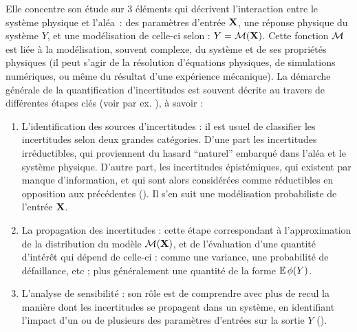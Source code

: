Elle concentre son étude sur 3 éléments qui décrivent l'interaction entre le système physique et l'aléa~: des paramètres d'entrée $\mathbf{X}$, une réponse physique du système $ Y$, et une modélisation de celle-ci selon : $ Y=\mathcal{M}(\mathbf{X})$. %
Cette fonction $\mathcal{M}$ est liée à la modélisation, souvent complexe, du système et de ses propriétés physiques (il peut s'agir de la résolution d'équations physiques, de simulations numériques, ou même du résultat d'une expérience mécanique).
%
La démarche générale de la quantification d'incertitudes est souvent décrite au travers de différentes étapes clés (voir par ex. \cite{sudret_uncertainty_2007, iooss_contributions_2009}), à savoir : %
%
\begin{enumerate}
    \item L'identification des sources d'incertitudes : 
        il est usuel de classifier les incertitudes selon deux grandes catégories. D'une part les incertitudes irréductibles, qui proviennent du hasard ``naturel'' embarqué dans l'aléa et le système physique. D'autre part, les incertitudes épistémiques, qui existent par manque d'information, et qui sont alors considérées comme réductibles en opposition aux précédentes (\cite{hullermeier_aleatoric_2019}). Il s'en suit une modélisation probabiliste de l'entrée $\mathbf{X}$. 
    \item La propagation des incertitudes : cette étape correspondant à l'approximation de la distribution du modèle $\mathcal{M}(\mathbf{X})$, et de l'évaluation d'une quantité d'intérêt qui dépend de celle-ci : comme une variance, une probabilité de défaillance, etc ; plus généralement une quantité de la forme $\mathbb{E}\,\phi( Y)$.
    \item L'analyse de sensibilité : son rôle est de comprendre avec plus de recul la manière dont les incertitudes se propagent dans un système, en identifiant l'impact d'un ou de plusieurs des paramètres d'entrées sur la sortie $ Y$ (\cite{iooss_review_2015}).
\end{enumerate}



